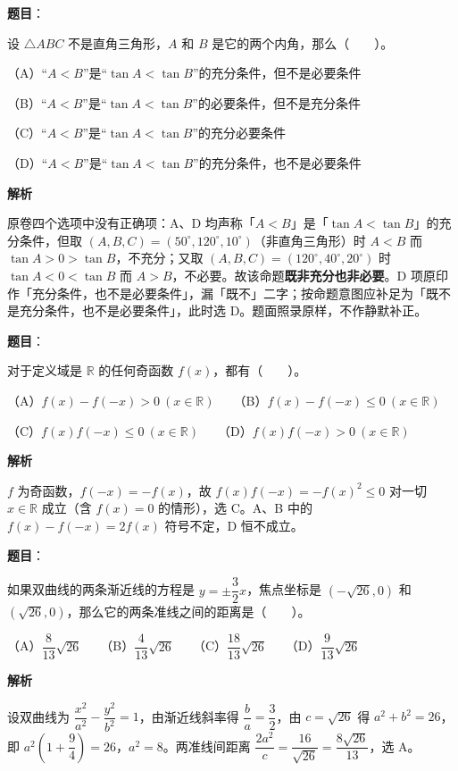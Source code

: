 \begin{answer}

\textbf{题目}：

设 $\triangle ABC$ 不是直角三角形，$A$ 和 $B$ 是它的两个内角，那么\mbox{（　　）}。

（A）“$A<B$”是“$\tan A<\tan B$”的充分条件，但不是必要条件

（B）“$A<B$”是“$\tan A<\tan B$”的必要条件，但不是充分条件

（C）“$A<B$”是“$\tan A<\tan B$”的充分必要条件

（D）“$A<B$”是“$\tan A<\tan B$”的充分条件，也不是必要条件

\textbf{解析}

原卷四个选项中没有正确项：A、D 均声称「$A<B$」是「$\tan A<\tan B$」的充分条件，但取 $(A,B,C)=(50^\circ,120^\circ,10^\circ)$（非直角三角形）时 $A<B$ 而 $\tan A>0>\tan B$，不充分；又取 $(A,B,C)=(120^\circ,40^\circ,20^\circ)$ 时 $\tan A<0<\tan B$ 而 $A>B$，不必要。故该命题\textbf{既非充分也非必要}。D 项原印作「充分条件，也不是必要条件」，漏「既不」二字；按命题意图应补足为「既不是充分条件，也不是必要条件」，此时选 D。题面照录原样，不作静默补正。


\end{answer}
\begin{answer}

\textbf{题目}：

对于定义域是 $\mathbb R$ 的任何奇函数 $f(x)$，都有\mbox{（　　）}。

（A）$f(x)-f(-x)>0\ (x\in\mathbb R)$　　（B）$f(x)-f(-x)\le0\ (x\in\mathbb R)$

（C）$f(x)f(-x)\le0\ (x\in\mathbb R)$　　（D）$f(x)f(-x)>0\ (x\in\mathbb R)$

\textbf{解析}

$f$ 为奇函数，$f(-x)=-f(x)$，故 $f(x)f(-x)=-f(x)^2\le0$ 对一切 $x\in\mathbb R$ 成立（含 $f(x)=0$ 的情形），选 C。A、B 中的 $f(x)-f(-x)=2f(x)$ 符号不定，D 恒不成立。


\end{answer}
\begin{answer}

\textbf{题目}：

如果双曲线的两条渐近线的方程是 $y=\pm\dfrac32x$，焦点坐标是 $(-\sqrt{26},0)$ 和 $(\sqrt{26},0)$，那么它的两条准线之间的距离是\mbox{（　　）}。

（A）$\dfrac8{13}\sqrt{26}$　　（B）$\dfrac4{13}\sqrt{26}$　　（C）$\dfrac{18}{13}\sqrt{26}$　　（D）$\dfrac9{13}\sqrt{26}$

\textbf{解析}

设双曲线为 $\dfrac{x^2}{a^2}-\dfrac{y^2}{b^2}=1$，由渐近线斜率得 $\dfrac{b}{a}=\dfrac32$，由 $c=\sqrt{26}$ 得 $a^2+b^2=26$，即 $a^2\left(1+\dfrac94\right)=26$，$a^2=8$。两准线间距离 $\dfrac{2a^2}{c}=\dfrac{16}{\sqrt{26}}=\dfrac{8\sqrt{26}}{13}$，选 A。


\end{answer}
